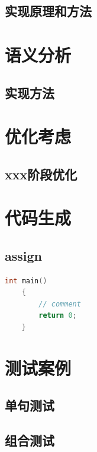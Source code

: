\documentclass{article}
\begin{document}
\subsection{实现原理和方法}

\section{语义分析}
\subsection{实现方法}

\section{优化考虑}
\subsection{xxx阶段优化}

\section{代码生成}
\subsection{assign}
\begin{lstlisting}[language=c++,showstringspaces=false]
    int main()
    {
        // comment
        return 0;
    }
\end{lstlisting}

\section{测试案例}
\subsection{单句测试}
\subsection{组合测试}
\end{document}
